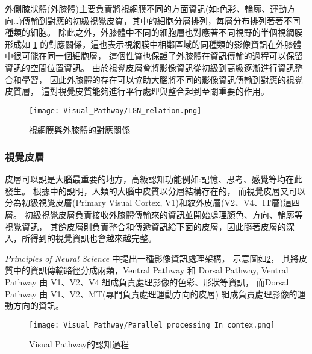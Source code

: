 \documentclass[class=NCU_thesis, crop=false]{standalone}
\begin{document}
外側膝狀體(外膝體)主要負責將視網膜不同的方面資訊(如:色彩、輪廓、運動方向…)傳輸到對應的初級視覺皮質，其中的細胞分層排列，每層分布排列著著不同種類的細胞。
除此之外，外膝體中不同的細胞層也對應著不同視野的半個視網膜形成如 \cref{fig:LGN_Relation}
的對應關係，這也表示視網膜中相鄰區域的同種類的影像資訊在外膝體中很可能在同一個細胞層，
這個性質也保證了外膝體在資訊傳輸的過程可以保留資訊的空間位置資訊。
由於視覺皮層會將影像資訊從初級到高級逐漸進行資訊整合和學習，
因此外膝體的存在可以協助大腦將不同的影像資訊傳輸到對應的視覺皮質層，
這對視覺皮質能夠進行平行處理與整合起到至關重要的作用。

\begin{figure}[H]
  \centering
  \texttt{[image: Visual\_Pathway/LGN\_relation.png]}
  \caption{視網膜與外膝體的對應關係~\cite{bear2016neuroscience}}
  \label{fig:LGN_Relation}
\end{figure}
\pagebreak

\subsubsection{視覺皮層}
皮層可以說是大腦最重要的地方，高級認知功能例如:記憶、思考、感覺等均在此發生。
根據\cite{10.5555993636}中的說明，人類的大腦中皮質以分層結構存在的，
而視覺皮層又可以分為初級視覺皮層(Primary Visual Cortex, V1)和紋外皮層(V2、V4、IT層)這四層。
初級視覺皮層負責接收外膝體傳輸來的資訊並開始處理顏色、方向、輪廓等視覺資訊，
其餘皮層則負責整合和傳遞資訊給下面的皮層，因此隨著皮層的深入，所得到的視覺資訊也會越來越完整。


\textit{Principles of Neural Science} \cite{1180370208}中提出一種影像資訊處理架構，
示意圖如\cref{fig:ParallelProcess}，
其將皮質中的資訊傳輸路徑分成兩類，Ventral Pathway 和 Dorsal Pathway, 
Ventral Pathway 由 V1、V2、V4 組成負責處理影像的色彩、形狀等資訊，
而Dorsal Pathway 由 V1、V2、MT(專門負責處理運動方向的皮層) 組成負責處理影像的運動方向的資訊。

\begin{figure}[H]
  \centering
  \texttt{[image: Visual\_Pathway/Parallel\_processing\_In\_contex.png]}
  \caption{Visual Pathway的認知過程~\cite{1180370208}}
  \label{fig:ParallelProcess}
\end{figure}

\end{document}
